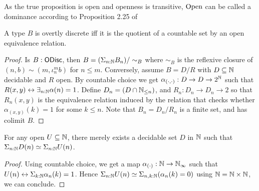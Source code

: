 \begin{remark}\label{OpenDominance}
  As the true proposition is open and openness is transitive, 
  $\mathrm{Open}$ can be called a dominance according to Proposition 2.25 of \cite{SyntheticTopologyLesnik}
\end{remark}

\begin{lemma}\label{OdiscQuotientCountableByOpen}\label{ODiscEqualityOpen}
  A type $B$ is overtly discrete iff it is the quotient of a countable set by an open equivalence relation. 
\end{lemma}
\begin{proof}
  Is $B:\mathsf{ODisc}$, then $B= (\Sigma_{n:\mathbb{N}} B_n)/\sim_B$ where $\sim_B$ is the reflexive closure of  
  $(n,b)\sim(m,\iota_n^m b)$ for $n\leq m$. 
%
  Conversely, assume $B= D/R$ with $D\subseteq \mathbb{N}$ decidable and $R$ open. 
  By countable choice we get $\alpha_{(\cdot,\cdot)}:D \to D \to 2^{\mathbb{N}}$ such that 
  $R(x,y)\leftrightarrow \exists_{n:\mathbb{N}}\alpha(n) = 1$. 
  Define $D_n = (D \cap \mathbb{N}_{\leq n})$, and $R_n : D_n \to D_n \to 2$ so that 
  $R_n(x,y)$ is the equivalence relation induced by the relation that checks whether
  $\alpha_{(x,y)}(k) =1$ for some $k\leq n$. 
  Note that $B_n = D_n/R_n$ is a finite set, and has colimit $B$. 
\end{proof}
\begin{lemma}\label{OpenInNAreDecidableInN}
For any open $U\subseteq \mathbb{N}$, there merely exists a decidable set $D$ in $\mathbb{N}$ such that 
$\Sigma_{n:\mathbb{N}} D(n) \simeq \Sigma_{n:\mathbb{N}} U(n)$.
\end{lemma}
\begin{proof}
  Using countable choice, we get a map $\alpha_{(\cdot)}: \mathbb{N} \to \mathbb{N}_{\infty}$ such that 
  $U(n) \leftrightarrow \Sigma_{k:\mathbb{N}} \alpha_n(k) = 1$. Hence 
  $\Sigma_{n:\mathbb{N}}U(n) \simeq \Sigma_{n,k:\mathbb{N}}(\alpha_n(k)=0)$
  using $\mathbb{N}=\mathbb{N}\times\mathbb{N}$, we can conclude. 
\end{proof}

